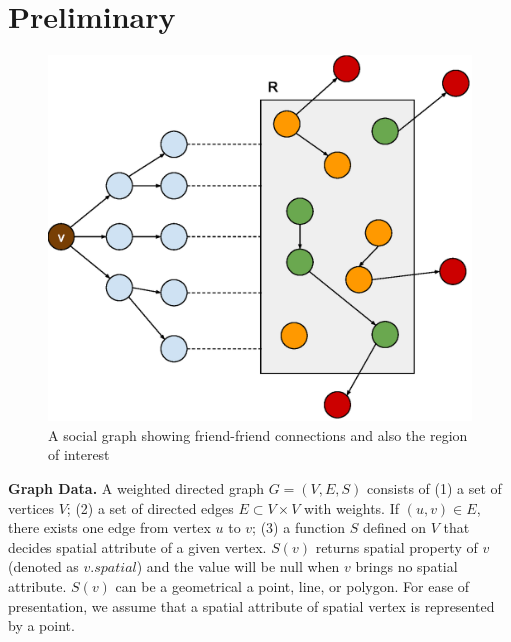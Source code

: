 \section{Preliminary}
\label{sec:preliminary}

\begin{figure}[h]
	\centering
	\includegraphics[width=0.88\linewidth]{images/a_social_graph.eps}
	\caption{A social graph showing friend-friend connections and also the region of interest}
	\label{fig:socio-spatial-graph}
\end{figure}

{\bf Graph Data.} A weighted directed graph $G=(V,E,S)$ consists of (1) a set of vertices $V$; (2) a set of directed edges $E\subset V\times V$ with weights. If $(u,v)\in E$, there exists one edge from vertex $u$ to $v$; (3) a function $S$ defined on $V$ that decides spatial attribute of a given vertex. $S(v)$ returns spatial property of $v$ (denoted as $v.spatial$) and the value will be null when $v$ brings no spatial attribute. $S(v)$ can be a geometrical a point, line, or polygon. For ease of presentation, we assume that a spatial attribute of spatial vertex is represented by a point.

